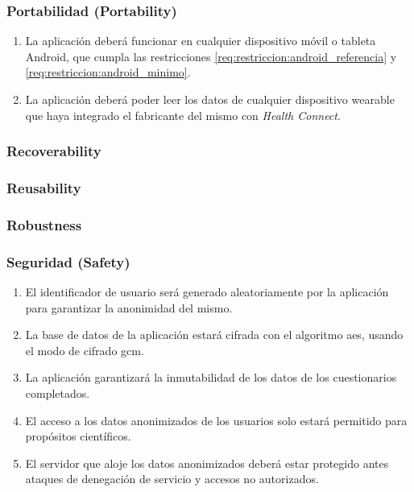         \subsubsection{Portabilidad (Portability)}
            \begin{enumerate}[resume, label=\textbf{\texttt{RNF-\arabic*}}]
                \item \label{req:no_funcionales:version_android} La aplicación deberá funcionar en cualquier dispositivo móvil o tableta Android, que cumpla las restricciones \ref{req:restriccion:android_referencia} y \ref{req:restriccion:android_minimo}.
                \item \label{req:no_funcionales:soporte_wearable} La aplicación deberá poder leer los datos de cualquier dispositivo \gls{wearable} que haya integrado el fabricante del mismo con \textit{Health Connect}.
            \end{enumerate}
        \subsubsection{Recoverability}
        \subsubsection{Reusability}
        \subsubsection{Robustness}
        \subsubsection{Seguridad (Safety)}
            \begin{enumerate}[resume, label=\textbf{\texttt{RNF-\arabic*}}]
                \item \label{req:no_funcionales:id_anonimo} El identificador de usuario será generado aleatoriamente por la aplicación para garantizar la anonimidad del mismo.  
                \item \label{req:no_funcionales:cifrado_bd} La base de datos de la aplicación estará cifrada con el algoritmo \gls{aes}, usando el modo de cifrado \gls{gcm}.
                \item \label{req:no_funcionales:inmutabilidad} La aplicación garantizará la inmutabilidad de los datos de los cuestionarios completados.
                \item \label{req:no_funcionales:datos_solo_cientificos} El acceso a los datos anonimizados de los usuarios solo estará permitido para propósitos científicos.
                \item \label{req:no_funcionales:ddos} El servidor que aloje los datos anonimizados deberá estar protegido antes ataques de denegación de servicio y accesos no autorizados.
            \end{enumerate}
